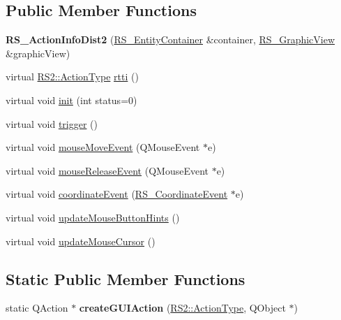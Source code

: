 \subsection*{Public Member Functions}
\begin{DoxyCompactItemize}
\item 
\hypertarget{classRS__ActionInfoDist2_a4dff7d0d840d325e733cda306f31212e}{{\bfseries R\-S\-\_\-\-Action\-Info\-Dist2} (\hyperlink{classRS__EntityContainer}{R\-S\-\_\-\-Entity\-Container} \&container, \hyperlink{classRS__GraphicView}{R\-S\-\_\-\-Graphic\-View} \&graphic\-View)}\label{classRS__ActionInfoDist2_a4dff7d0d840d325e733cda306f31212e}

\item 
virtual \hyperlink{classRS2_afe3523e0bc41fd637b892321cfc4b9d7}{R\-S2\-::\-Action\-Type} \hyperlink{classRS__ActionInfoDist2_a6aea59bff1919231e5c3b69e73083c0f}{rtti} ()
\item 
virtual void \hyperlink{classRS__ActionInfoDist2_a8bd8a0763e16359f9c376a65941346a7}{init} (int status=0)
\item 
virtual void \hyperlink{classRS__ActionInfoDist2_ae13989ec559c87a9a888878e887671b9}{trigger} ()
\item 
virtual void \hyperlink{classRS__ActionInfoDist2_a2d32d0797d17ef7e8ac046846a9be9dc}{mouse\-Move\-Event} (Q\-Mouse\-Event $\ast$e)
\item 
virtual void \hyperlink{classRS__ActionInfoDist2_a99d9db0eff74bb989a6b3fd2a23edee0}{mouse\-Release\-Event} (Q\-Mouse\-Event $\ast$e)
\item 
virtual void \hyperlink{classRS__ActionInfoDist2_a1b66a38edf196656d29bf6992389eafc}{coordinate\-Event} (\hyperlink{classRS__CoordinateEvent}{R\-S\-\_\-\-Coordinate\-Event} $\ast$e)
\item 
virtual void \hyperlink{classRS__ActionInfoDist2_a377b9291a5d99fb1841802cbfa03cd06}{update\-Mouse\-Button\-Hints} ()
\item 
virtual void \hyperlink{classRS__ActionInfoDist2_acbb1391d5e4516ea5c0fa078fe8b9c65}{update\-Mouse\-Cursor} ()
\end{DoxyCompactItemize}
\subsection*{Static Public Member Functions}
\begin{DoxyCompactItemize}
\item 
\hypertarget{classRS__ActionInfoDist2_af7f7cc1420c43e9a41f10afbfa615349}{static Q\-Action $\ast$ {\bfseries create\-G\-U\-I\-Action} (\hyperlink{classRS2_afe3523e0bc41fd637b892321cfc4b9d7}{R\-S2\-::\-Action\-Type}, Q\-Object $\ast$)}\label{classRS__ActionInfoDist2_af7f7cc1420c43e9a41f10afbfa615349}

\end{DoxyCompactItemize}
